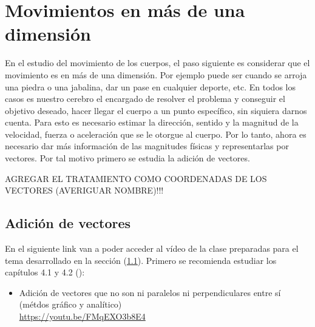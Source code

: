 
\section{Movimientos en más de una dimensión}
\label{c.2d}

En el estudio del movimiento de los cuerpos, el paso siguiente es considerar que
el movimiento es en más de una dimensión. Por ejemplo puede ser cuando se arroja
una piedra o una jabalina, dar un pase en cualquier deporte, etc. En todos los
casos es nuestro cerebro el encargado de resolver el problema y conseguir el
objetivo deseado, hacer llegar el cuerpo a un punto específico, sin siquiera
darnos cuenta. Para esto es necesario estimar la dirección, sentido y la
magnitud de la velocidad, fuerza o aceleración que se le otorgue al cuerpo. Por
lo tanto, ahora es necesario dar más información de las magnitudes físicas y
representarlas por vectores. Por tal motivo primero se estudia la adición de
vectores.

AGREGAR EL TRATAMIENTO COMO COORDENADAS DE LOS VECTORES (AVERIGUAR NOMBRE)!!!

\subsection{Adición de vectores}
\label{c.sv}

En el siguiente link van a poder acceder al vídeo de la clase
preparadas para el tema desarrollado en la sección (\ref{c.sv}). Primero se
recomienda estudiar los capítulos 4.1 y 4.2 (\citeauthor{alvarenga}):

\begin{itemize}
  \item Adición de vectores que no son ni paralelos ni perpendiculares entre sí
  (métdos gráfico y analítico)\\
    \href{https://youtu.be/FMqEXO3b8E4}{https://youtu.be/FMqEXO3b8E4}
\end{itemize}



